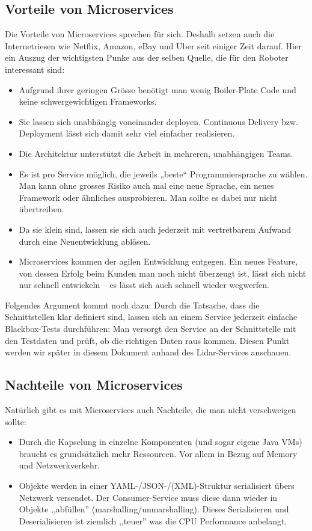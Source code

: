 \subsection{Vorteile von Microservices}
Die Vorteile von Microservices sprechen für sich. Deshalb setzen auch die Internetriesen wie Netflix, Amazon, eBay und Uber seit einiger Zeit darauf. Hier ein Auszug der wichtigsten Punke aus der selben Quelle\cite{informatik-aktuell-microservices}, die für den Roboter interessant sind:
\begin{formal}
	\begin{itemize}
		\item
		Aufgrund ihrer geringen Grösse benötigt man wenig Boiler-Plate Code und keine schwergewichtigen Frameworks.
		\item
		Sie lassen sich unabhängig voneinander deployen. Continuous Delivery bzw. Deployment lässt sich damit sehr viel einfacher realisieren.
		\item
		Die Architektur unterstützt die Arbeit in mehreren, unabhängigen Teams.
		\item
		Es ist pro Service möglich, die jeweils „beste“ Programmiersprache zu wählen. Man kann ohne grosses Risiko auch mal eine neue Sprache, ein neues Framework oder ähnliches ausprobieren. Man sollte es dabei nur nicht übertreiben.
		\item
		Da sie klein sind, lassen sie sich auch jederzeit mit vertretbarem Aufwand durch eine Neuentwicklung ablösen.
		\item
		Microservices kommen der agilen Entwicklung entgegen. Ein neues Feature, von dessen Erfolg beim Kunden man noch nicht überzeugt ist, lässt sich nicht nur schnell entwickeln – es lässt sich auch schnell wieder wegwerfen.
	\end{itemize}
\end{formal}

Folgendes Argument kommt noch dazu: Durch die Tatsache, dass die Schnittstellen klar definiert sind, lassen sich an einem Service jederzeit einfache Blackbox-Tests durchführen: Man versorgt den Service an der Schnittstelle mit den Testdaten und prüft, ob die richtigen Daten raus kommen. Diesen Punkt werden wir später in diesem Dokument anhand des Lidar-Services anschauen.
\subsection{Nachteile von Microservices}
Natürlich gibt es mit Microservices auch Nachteile, die man nicht verschweigen sollte:
\begin{itemize}
	\item
	Durch die Kapselung in einzelne Komponenten (und sogar eigene Java VMs) braucht es  grundsätzlich mehr Ressourcen. Vor allem in Bezug auf Memory und Netzwerkverkehr.
	\item
	Objekte werden in einer YAML-/JSON-/(XML)-Struktur serialisiert übers Netzwerk versendet. Der Consumer-Service muss diese dann wieder in Objekte ,,abfüllen'' (marshalling/unmarshalling). Dieses Serialisieren und Deserialisieren ist ziemlich ,,teuer'' was die CPU Performance anbelangt.
	
\end{itemize}


